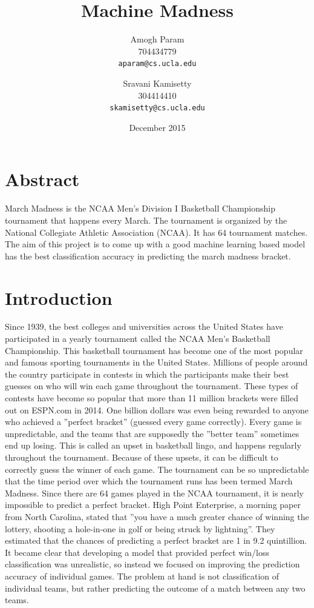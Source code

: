 \documentclass{article}
\title{Machine Madness}
\author{
  Amogh Param\\
  704434779\\
  \texttt{aparam@cs.ucla.edu}
  \and
  Sravani Kamisetty\\
  304414410\\
  \texttt{skamisetty@cs.ucla.edu}
}
\date{December 2015}
\begin{document}
    \maketitle
    
    \begin{multicols}{2}
    \section*{Abstract}  
	March Madness is the NCAA Men’s Division I Basketball Championship tournament that happens every March. The tournament is organized by the National Collegiate Athletic Association (NCAA). It has 64 tournament matches. The aim of this project is to come up with a good machine learning based model has the best classification accuracy in predicting the march madness bracket.
   
    \section{Introduction}
    Since 1939, the best colleges and universities across the United States have participated in a yearly tournament called the NCAA Men’s Basketball Championship. This basketball tournament has become one of the most popular and famous sporting tournaments in the United States. Millions of people around the country participate in contests in which the participants make their best guesses on who will win each game throughout the tournament. These types of contests have become so popular that more than 11 million brackets were filled out on ESPN.com in 2014. One billion dollars was even being rewarded to anyone who achieved a ”perfect bracket” (guessed every game correctly). Every game is unpredictable, and the teams that are supposedly the ”better team” sometimes end up losing. This is called an upset in basketball lingo, and happens regularly throughout the tournament. Because of these upsets, it can be difficult to correctly guess the winner of each game. The tournament can be so unpredictable that the time period over which the tournament runs has been termed March Madness. Since there are 64 games played in the NCAA tournament, it is nearly impossible to predict a perfect bracket. High Point Enterprise, a morning paper from North Carolina, stated that ”you have a much greater chance of winning the lottery, shooting a hole-in-one in golf or being struck by lightning”. They estimated that the chances of predicting a perfect bracket are 1 in 9.2 quintillion. It became clear that developing a model that provided perfect win/loss classification was unrealistic, so instead we focused on improving the prediction accuracy of individual games. The problem at hand is not classification of individual teams, but rather predicting the outcome of a match between any two teams. 
    

\end{multicols}
\end{document}
